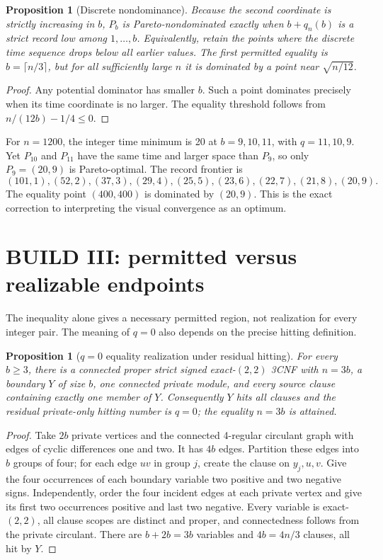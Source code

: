 \documentclass[11pt]{article}
\newtheorem{proposition}[theorem]{Proposition}
\begin{document}
\begin{proposition}[Discrete nondominance]
Because the second coordinate is strictly increasing in $b$, $P_b$ is
Pareto-nondominated exactly when $b+q_n(b)$ is a strict record low among
$1,\ldots,b$.  Equivalently, retain the points where the discrete time
sequence drops below all earlier values.  The first permitted equality is
$b=\lceil n/3\rceil$, but for all sufficiently large $n$ it is dominated by a
point near $\sqrt{n/12}$.
\end{proposition}
\begin{proof}
Any potential dominator has smaller $b$.  Such a point dominates precisely
when its time coordinate is no larger.  The equality threshold follows from
$n/(12b)-1/4\le0$.
\end{proof}

For $n=1200$, the integer time minimum is 20 at $b=9,10,11$, with
$q=11,10,9$.  Yet $P_{10}$ and $P_{11}$ have the same time and larger space
than $P_9$, so only $P_9=(20,9)$ is Pareto-optimal.  The record frontier is
\[
(101,1),(52,2),(37,3),(29,4),(25,5),(23,6),(22,7),(21,8),(20,9).
\]
The equality point $(400,400)$ is dominated by $(20,9)$.  This is the exact
correction to interpreting the visual convergence as an optimum.

\section{BUILD III: permitted versus realizable endpoints}
The inequality alone gives a necessary permitted region, not realization for
every integer pair.  The meaning of $q=0$ also depends on the precise hitting
definition.

\begin{proposition}[$q=0$ equality realization under residual hitting]
For every $b\ge3$, there is a connected proper strict signed exact-$(2,2)$
3CNF with $n=3b$, a boundary $Y$ of size $b$, one connected private module,
and every source clause containing exactly one member of $Y$.  Consequently
$Y$ hits all clauses and the residual private-only hitting number is $q=0$;
the equality $n=3b$ is attained.
\end{proposition}
\begin{proof}
Take $2b$ private vertices and the connected 4-regular circulant graph with
edges of cyclic differences one and two.  It has $4b$ edges.  Partition these
edges into $b$ groups of four; for each edge $uv$ in group $j$, create the
clause on $y_j,u,v$.  Give the four occurrences of each boundary variable two
positive and two negative signs.  Independently, order the four incident
edges at each private vertex and give its first two occurrences positive and
last two negative.  Every variable is exact-$(2,2)$, all clause scopes are
distinct and proper, and connectedness follows from the private circulant.
There are $b+2b=3b$ variables and $4b=4n/3$ clauses, all hit by $Y$.
\end{proof}
\end{document}
